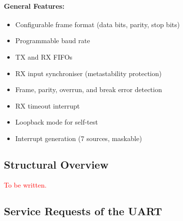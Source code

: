 \paragraph{General Features:}
\begin{itemize}
  \item Configurable frame format (data bits, parity, stop bits)
  \item Programmable baud rate
  \item TX and RX FIFOs
  \item RX input synchroniser (metastability protection)
  \item Frame, parity, overrun, and break error detection
  \item RX timeout interrupt
  \item Loopback mode for self-test
  \item Interrupt generation (7 sources, maskable)
\end{itemize}

\subsection{Structural Overview}
\textcolor{red}{To be written.}


\subsection{Service Requests of the UART}

